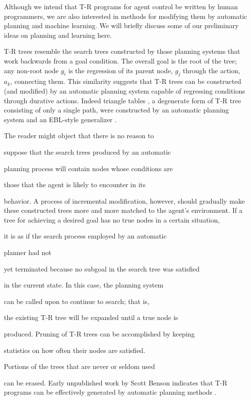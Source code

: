 Although we intend that T-R programs for agent control be written by human  
programmers, we are also interested in methods for modifying them by  
automatic planning and machine learning. We will briefly discuss some of our  
preliminary ideas on planning and learning here.

T-R trees resemble the search trees constructed by those planning systems  
that work backwards from a goal condition.  The overall goal is the root of  
the tree; any non-root node $g_i$ is the regression of its parent node, $g_j$  
through the action, $a_k$, connecting them.  This similarity  suggests that  
T-R trees can be constructed (and modified) by an automatic planning system  
capable of regressing conditions through durative actions.  Indeed  triangle  
tables \cite{Fikes}, a degenerate form of T-R tree consisting of only a  
single path, were constructed by an automatic planning system and an  
EBL-style generalizer \cite{Mitchell}. 


The reader might object that there is no reason to 

suppose that the search trees produced by an automatic 

planning process will contain nodes whose conditions are 

those that the agent is likely to encounter in its 

behavior.  A process of incremental modification, however,  should gradually  
make these constructed trees
more and more matched to the agent's environment.  If a tree for achieving a  
desired goal has no true nodes in a certain situation, 

it is as if the search process employed by an automatic 

planner had not 

yet terminated because no subgoal in the search tree was satisfied 

in the current state.  In this case, the planning system 

can be called upon to continue to search; that is, 

the existing T-R tree will be expanded until a true node is 

produced. Pruning of T-R trees can be accomplished by keeping 

statistics on how often their nodes are satisfied.  

Portions of the trees that are never or seldom used 

can be erased.  Early unpublished work by Scott Benson indicates that T-R  
programs can be effectively generated by automatic planning methods  
\cite{Benson}.

